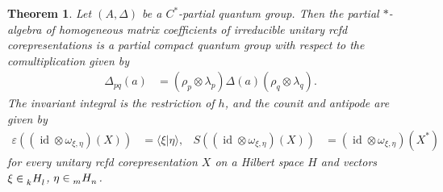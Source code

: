 \documentclass[11pt]{article}
\DeclareMathOperator{\id}{id}
\newcommand{\Gr}[5]{\tensor*[^{#2}_{#4}]{#1}{^{#3}_{#5}}}%
\newcommand{\Grd}[3]{\Gr{#1}{}{}{#2}{#3}}
\newtheorem{Theorem}{Theorem}[section]
\theoremstyle{definition}
\numberwithin{equation}{section}
\begin{document}
\begin{Theorem} Let $(A,\Delta)$ be a $C^{*}$-partial quantum group.
  Then the partial $*$-algebra of homogeneous matrix coefficients of irreducible unitary rcfd
  corepresentations is a partial compact quantum group with respect to the comultiplication given by
  \begin{align} \label{eq:pcqg-comultiplication}
    \Delta_{pq}(a) &= (\rho_{p} \otimes \lambda_{p})\Delta(a)(\rho_{q}\otimes \lambda_{q}).
  \end{align}
  The invariant integral is the restriction of $h$, and the counit and antipode are given by
  \begin{align} \label{eq:pcqg-counit-antipode}
    \varepsilon((\id \otimes \omega_{\xi,\eta})(X)) &= \langle \xi|\eta\rangle, &
    S((\id \otimes \omega_{\xi,\eta})(X)) &= (\id \otimes \omega_{\xi,\eta})(X^{*})
  \end{align}
  for every unitary rcfd corepresentation $X$ on a Hilbert space $H$ and vectors $\xi \in
  \Grd{H}{k}{l}$, $\eta \in \Grd{H}{m}{n}$. 
\end{Theorem}
\end{document}
